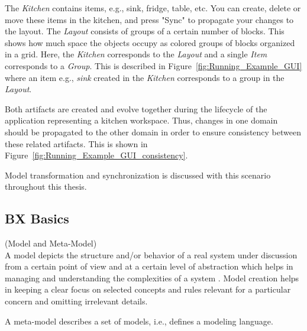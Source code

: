 The \textit{Kitchen} contains items, e.g., sink, fridge, table, etc. You can create, delete or move these items in the kitchen, and press "Sync" to propagate your changes to the layout. The \textit{Layout} consists of groups of a certain number of blocks. This shows how much space the objects occupy as colored groups of blocks organized in a grid. Here, the \textit{Kitchen} corresponds to the \textit{Layout} and a single \textit{Item} corresponds to a \textit{Group}. This is described in Figure~\ref{fig:Running_Example_GUI} where an item e.g., \textit{sink} created in the \textit{Kitchen} corresponds to a group in the \textit{Layout}.

Both artifacts are created and evolve together during the lifecycle of the application representing a kitchen workspace. Thus, changes in one domain should be propagated to the other domain in order to ensure consistency between these related artifacts. This is shown in Figure~\ref{fig:Running_Example_GUI_consistency}.

Model transformation and synchronization is discussed with this scenario throughout this thesis. 

\subsection{BX Basics}\label{subsec:definitions}

\begin{defn}\label{defModel} (Model and Meta-Model)\\
A model depicts the structure and/or behavior of a real system under discussion from a certain point of view and at a certain level of abstraction which helps in managing and understanding the complexities of a system \cite{uml}\cite{mdsd}. Model creation helps in keeping a clear focus on selected concepts and rules relevant for a particular concern and omitting irrelevant details.

A meta-model describes a set of models, i.e., defines a modeling language. 
\end{defn} 

